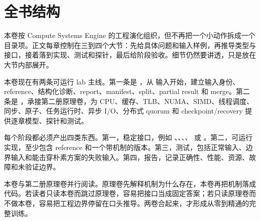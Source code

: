\chapter*{全书结构}

本卷按 Compute Systems Engine 的工程演化组织，但不再把一个小动作拆成一个目录项。正文每章控制在三到四个大节：先给具体问题和输入样例，再推导类型与接口，接着落到实现、测试和探针，最后给阶段验收。细节仍然要讲透，只是放在大节内部展开。

本卷现在有两条可运行 lab 主线。第一条是 ，从  输入开始，建立输入身份、reference、结构化诊断、report、manifest、split、partial result 和 merge。第二条是 ，承接第二册原理卷，为 CPU、缓存、TLB、NUMA、SIMD、线程调度、同步、原子、任务运行时、异步 I/O、分布式 quorum 和 checkpoint/recovery 提供逐章模型、探针和测试。

每个阶段都必须产出四类东西。第一，稳定接口，例如 、、、、 或 。第二，可运行实现，至少包含 reference 和一个带机制的版本。第三，测试，包括正常输入、边界输入和能击穿朴素方案的失败输入。第四，报告，记录正确性、性能、资源、故障和未验证边界。

本卷与第二册原理卷并行阅读。原理卷先解释机制为什么存在，本卷再把机制落成代码。若读者只读本卷而跳过原理卷，容易把接口当成固定答案；若只读原理卷而不做本卷，容易把工程边界停留在口头推导。两卷合起来，才形成从零到精通的完整训练。
